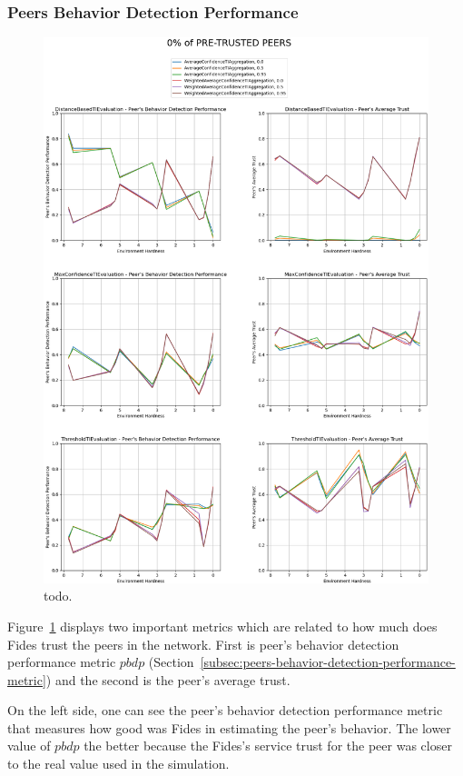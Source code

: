 \cleartoleftpage
\subsubsection{Peers Behavior Detection Performance}

\begin{figure}[hp]
    \centering
    \includegraphics[width=1.0\textwidth]{assets/0_peer_trust.png}
    \caption{todo.}
    \label{fig:0-peer-trust}
\end{figure}

Figure~\ref{fig:0-peer-trust} displays two important metrics which are related to how much does Fides trust the peers in the network. First is peer's behavior detection performance metric $pbdp$ (Section~\ref{subsec:peers-behavior-detection-performance-metric}) and the second is the peer's average trust.

On the left side, one can see the peer's behavior detection performance metric that measures how good was Fides in estimating the peer's behavior. The lower value of $pbdp$ the better because the Fides's service trust for the peer was closer to the real value used in the simulation.

